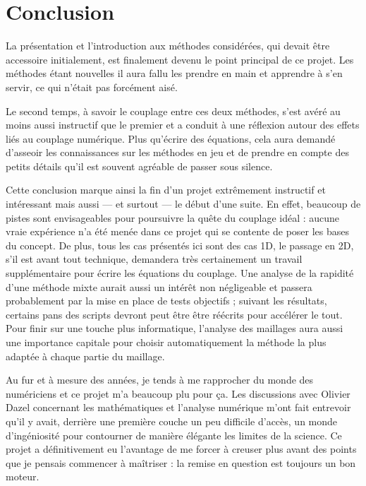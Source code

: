 \section*{Conclusion}

La présentation et l'introduction aux méthodes considérées, qui devait être accessoire initialement, est finalement
devenu le point principal de ce projet. Les méthodes étant nouvelles il aura fallu les prendre en main et apprendre
à s'en servir, ce qui n'était pas forcément aisé.

Le second temps, à savoir le couplage entre ces deux méthodes, s'est avéré au moins aussi instructif que le premier et a
conduit à une réflexion autour des effets liés au couplage numérique. Plus qu'écrire des équations, cela aura demandé
d'asseoir les connaissances sur les méthodes en jeu et de prendre en compte des petits détails qu'il est souvent
agréable de passer sous silence.

Cette conclusion marque ainsi la fin d'un projet extrêmement instructif et intéressant mais aussi --- et surtout --- le début d'une
suite. En effet, beaucoup de pistes sont envisageables pour poursuivre la quête du couplage idéal  : aucune vraie
expérience n'a été menée dans ce projet qui se contente de poser les bases du concept. De plus, tous les cas
présentés ici sont des cas 1D, le passage en 2D, s'il est avant tout technique, demandera très certainement un travail
supplémentaire pour écrire les équations du couplage. Une analyse de la rapidité d'une méthode mixte aurait aussi un
intérêt non négligeable et passera probablement par la mise en place de tests objectifs ; suivant les résultats,
certains pans des scripts devront peut être être réécrits pour accélérer le tout. Pour finir sur une touche plus
informatique, l'analyse des maillages aura aussi une importance capitale pour choisir automatiquement la méthode la
plus adaptée à chaque partie du maillage.

Au fur et à mesure des années, je tends à me rapprocher du monde des numériciens et ce projet m'a beaucoup plu pour ça.
Les discussions avec Olivier Dazel concernant les mathématiques et l'analyse numérique m'ont fait entrevoir qu'il y
avait, derrière une première couche un peu difficile d'accès, un monde d'ingéniosité pour contourner de manière élégante
les limites de la science. Ce projet a définitivement eu l'avantage de me forcer à creuser plus avant des points que je
pensais commencer à maîtriser : la remise en question est toujours un bon moteur.
